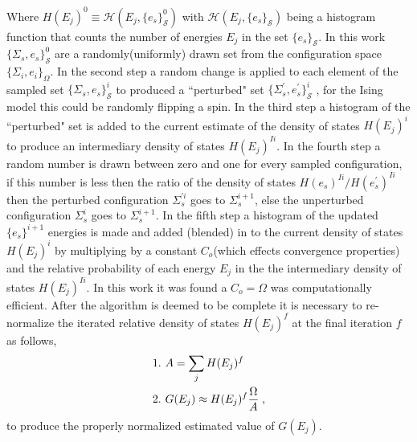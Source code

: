 \documentclass[twocolumn]{article}
\begin{document}
Where  $H(E_j)^0 \equiv \mathcal{H}(E_j,\{e_s\}_{\mathcal{S}}^0)$ with $\mathcal{H}(E_j,\{e_s\}_{\mathcal{S}})$ being a histogram function that counts the number of energies $E_j$ in the set $\{e_s\}_{\mathcal{S}}$. In this work $\{\Sigma_{s},e_s\}_{\mathcal{S}}^0$  are a randomly(uniformly) drawn set from the configuration space $\{ \Sigma_i, e_i \}_\Omega $. In the second step  a random change is applied to each element of the sampled set $\{\Sigma_{s},e_s\}_{\mathcal{S}}^i$ to produced a ``perturbed" set $ \{\Sigma_{s}^{'},e_s^{'}\}_{\mathcal{S}}^i$ , for the Ising model this could be randomly flipping a spin. In the third step a histogram of the ``perturbed" set is added to the current estimate of the density of states $H(E_j)^i$ to produce an intermediary density of states $H(E_j)^{Ii}$. In the fourth step a random number is drawn between zero and one for every sampled configuration, if this number is less then the ratio of the density of states $H(e_s)^{Ii}/H(e_s^{'})^{Ii}$ then the perturbed configuration $\Sigma_{s}^{'i}$ goes to $\Sigma_{s}^{i+1}$,  else the unperturbed configuration $\Sigma_{s}^{i}$ goes to $\Sigma_{s}^{i+1}$. In the fifth step a histogram of the updated $\{ e_s \}^{i+1}$ energies is made and added (blended) in to the current density of states $H(E_j)^i$   by multiplying  by a constant $C_{o}$(which effects convergence properties) and the relative probability of each energy $E_j$ in the the intermediary density of states $H(E_j)^{Ii}$. In this work it was found a $C_{o}=\Omega$ was computationally efficient. After the algorithm is deemed to be complete it is necessary to re-normalize the iterated relative density of states $H(E_j)^f$ at the final iteration $f$ as follows, 
\begin{equation}
\begin{split}
&1. \hspace{0.125cm} A = \sum_jH(E_j)^f\\
&2. \hspace{0.125cm} G(E_j)\approx H(E_j)^f \frac{\Omega}{A} \;,
\end{split}
\end{equation}
to produce the properly normalized estimated value of $G(E_j)$. 
\end{document}

